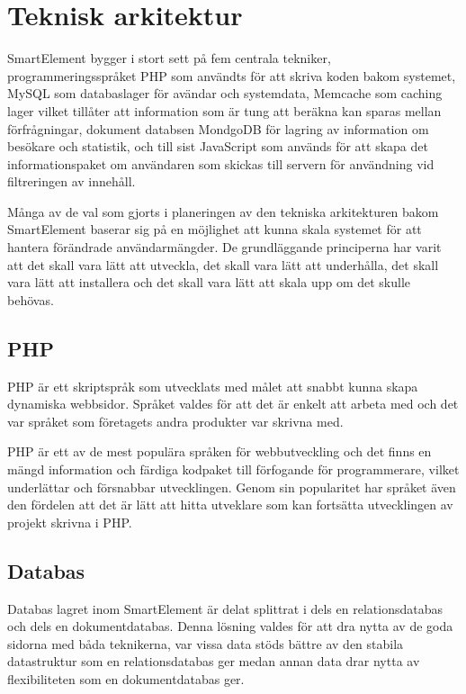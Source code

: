 \section{Teknisk arkitektur}

SmartElement bygger i stort sett på fem centrala tekniker, programmeringsspråket PHP som användts för att skriva koden bakom systemet, MySQL som databaslager för avändar och systemdata, Memcache som caching lager vilket tillåter att information som är tung att beräkna kan sparas mellan förfrågningar, dokument databsen MondgoDB för lagring av information om besökare och statistik, och till sist JavaScript som används för att skapa det informationspaket om användaren som skickas till servern för användning vid filtreringen av innehåll.

Många av de val som gjorts i planeringen av den tekniska arkitekturen bakom SmartElement baserar sig på en möjlighet att kunna skala systemet för att hantera förändrade användarmängder. De grundläggande principerna har varit att det skall vara lätt att utveckla, det skall vara lätt att underhålla, det skall vara lätt att installera och det skall vara lätt att skala upp om det skulle behövas.

\subsection{PHP}

PHP är ett skriptspråk som utvecklats med målet att snabbt kunna skapa dynamiska webbsidor. \citep{phpmanual} Språket valdes för att det är enkelt att arbeta med och det var språket som företagets andra produkter var skrivna med.

PHP är ett av de mest populära språken för webbutveckling \citep{tiobe} och det finns en mängd information och färdiga kodpaket till förfogande för programmerare, vilket underlättar och försnabbar utvecklingen. Genom sin popularitet har språket även den fördelen att det är lätt att hitta utveklare som kan fortsätta utvecklingen av projekt skrivna i PHP.

\subsection{Databas}

Databas lagret inom SmartElement är delat splittrat i dels en relationsdatabas och dels en dokumentdatabas. Denna lösning valdes för att dra nytta av de goda sidorna med båda teknikerna, var vissa data stöds bättre av den stabila datastruktur som en relationsdatabas ger medan annan data drar nytta av flexibiliteten som en dokumentdatabas ger.

